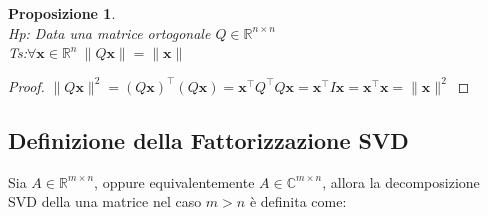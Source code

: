 \documentclass[11pt]{article}
\newtheorem{proposition}{Proposizione}
\newcommand{\R}{\mathbb{R}}
\begin{document}
\begin{proposition}\label{cons norm}
\textbf{}\\
\textit{Hp:} Data una matrice ortogonale $Q \in \R^{n \times n}$\\
\textit{Ts:$\forall \mathbf{x}\in \R^n \ \|Q\mathbf{x}\|=\|\mathbf{x}\|$} 
\end{proposition}
\begin{proof} $\|Q\mathbf{x}\|^2 = (Q \mathbf{x})^\top      (Q \mathbf{x}) = \mathbf{x}^\top       Q^\top       Q \mathbf{x} = \mathbf{x}^\top      I\mathbf{x} = \mathbf{x}^\top      \mathbf{x} = \|\mathbf{x}\|^2$
\end{proof}

\subsection{Definizione della Fattorizzazione SVD}
Sia $A\in\mathbb{R}^{m\times n}$, oppure equivalentemente $A\in\mathbb{C}^{m\times n}$, allora la decomposizione SVD della una matrice nel caso $m>n$ è definita come:
\end{document}
